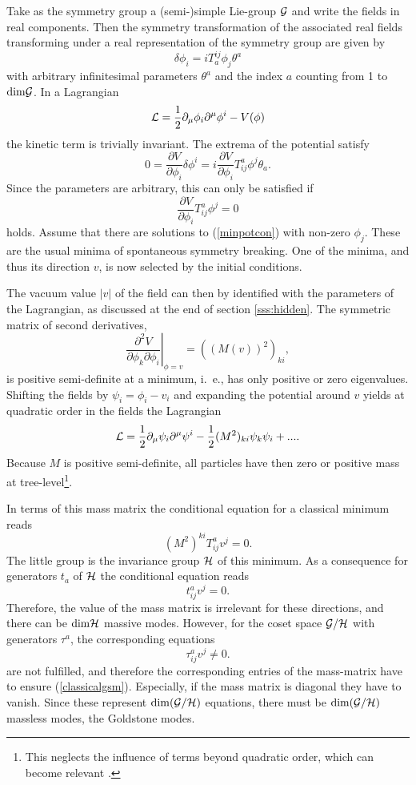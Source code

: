 \documentclass[final,twoside,12pt]{article}
\newcommand*{\La}{{\cal{L}}}
\newcommand*{\no}{\noindent}
\newcommand*{\be}{\begin{equation}}
\newcommand*{\ee}{\end{equation}}
\newcommand*{\pd}{\partial}
\newcommand*{\pdm}{\pd_{\mu}}
\newcommand*{\pref}[1]{(\ref{#1})}
\newcommand*{\nn}{\nonumber}
\newcommand*{\1}{1\!\!\!\bot}
\begin{document}
Take as the symmetry group a (semi-)simple Lie-group ${\cal G}$ and write the fields in real components. Then the symmetry transformation of the associated real fields transforming under a real representation of the symmetry group are given by
\be
\delta\phi_i=iT^{ij}_a\phi_j\theta^a
\ee
\no with arbitrary infinitesimal parameters $\theta^a$ and the index $a$ counting from 1 to $\mathrm{dim}{\cal G}$. In a Lagrangian
\be
\La=\frac{1}{2}\pdm\phi_i\pd^\mu\phi^i-V(\phi)\nn
\ee
\no the kinetic term is trivially invariant. The extrema of the potential satisfy
\be
0=\frac{\pd V}{\pd\phi_i}\delta\phi^i=i\frac{\pd V}{\pd\phi_i} T_{ij}^a\phi^j\theta_a\nn.
\ee
\no Since the parameters are arbitrary, this can only be satisfied if
\be
\frac{\pd V}{\pd\phi_i}T_{ij}^a\phi^j=0\label{minpotcon}
\ee
\no holds. Assume that there are solutions to \pref{minpotcon} with non-zero $\phi_j$. These are the usual minima of spontaneous symmetry breaking. One of the minima, and thus its direction $v$, is now selected by the initial conditions.

The vacuum value $|v|$ of the field can then by identified with the parameters of the Lagrangian, as discussed at the end of section \ref{sss:hidden}. The symmetric matrix of second derivatives,
\be
\left.\frac{\pd^2 V}{\pd\phi_k\pd\phi_i}\right|_{\phi=v}=((M(v))^2)_{ki}\nn,
\ee
\no is positive semi-definite at a minimum, i.\ e., has only positive or zero eigenvalues. Shifting the fields by $\psi_i=\phi_i-v_i$ and expanding the potential around $v$ yields at quadratic order in the fields the Lagrangian
\be
\La=\frac{1}{2}\pd_\mu\psi_i\pd^\mu\psi^i-\frac{1}{2}(M^2)_{ki}\psi_k\psi_i+...\nn.
\ee
\no Because $M$ is positive semi-definite, all particles have then zero or positive mass at tree-level\footnote{This neglects the influence of terms beyond quadratic order, which can become relevant \cite{Strocchi:2005yk}.}.

In terms of this mass matrix the conditional equation for a classical minimum reads
\be
(M^2)^{ki} T^a_{ij} v^j=0\label{classicalgsm}.
\ee
\no The little group is the invariance group ${\cal H}$ of this minimum. As a consequence for generators $t_a$ of ${\cal H}$ the conditional equation reads
\be
t^a_{ij}v^j=0\nn.
\ee
\no Therefore, the value of the mass matrix is irrelevant for these directions, and there can be $\mathrm{dim}{\cal H}$ massive modes. However, for the coset space ${\cal G}/{\cal H}$ with generators $\tau^a$, the corresponding equations
\be
\tau^a_{ij}v^j\neq 0\nn.
\ee
\no are not fulfilled, and therefore the corresponding entries of the mass-matrix have to ensure \pref{classicalgsm}. Especially, if the mass matrix is diagonal they have to vanish. Since these represent $\mathrm{dim}({\cal G}/{\cal H})$ equations, there must be $\mathrm{dim}({\cal G}/{\cal H})$ massless modes, the Goldstone modes.
\end{document}
